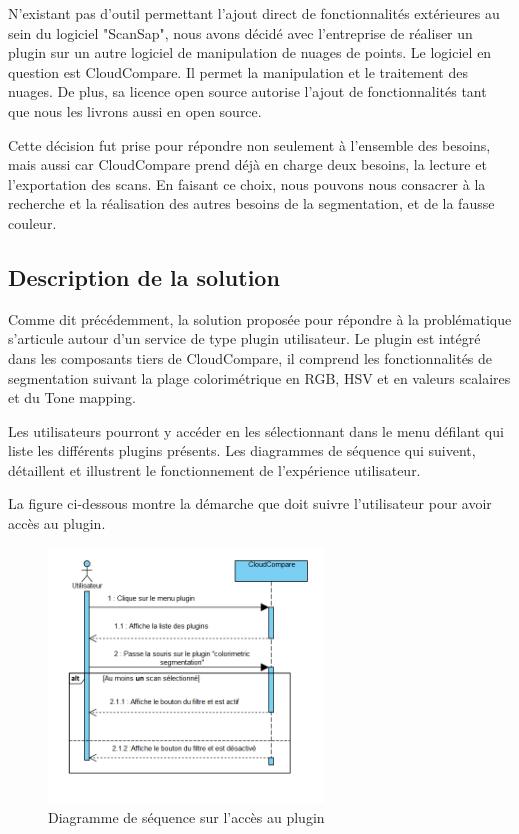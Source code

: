 \documentclass[12pt,titlepage,french]{article}
\begin{document}
N'existant pas d'outil permettant l'ajout direct de fonctionnalités extérieures au sein du logiciel "ScanSap", nous avons décidé avec l'entreprise de réaliser un plugin sur un autre logiciel de manipulation de nuages de points. Le logiciel en question est CloudCompare. Il permet la manipulation et le traitement des nuages. De plus, sa licence open source autorise l'ajout de fonctionnalités tant que nous les livrons aussi en open source. \newline

Cette décision fut prise pour répondre non seulement à l'ensemble des besoins, mais aussi car CloudCompare prend déjà en charge deux besoins, la lecture et l'exportation des scans. En faisant ce choix, nous pouvons nous consacrer à la recherche et la réalisation des autres besoins de la segmentation, et de la fausse couleur.

\subsection{Description de la solution}

Comme dit précédemment, la solution proposée pour répondre à la problématique s'articule autour d'un service de type plugin utilisateur. Le plugin est intégré dans les composants tiers de CloudCompare, il comprend les fonctionnalités de segmentation suivant la plage colorimétrique en RGB, HSV et en valeurs scalaires et du Tone mapping.  \newline

Les utilisateurs pourront y accéder en les sélectionnant dans le menu défilant qui liste les différents plugins présents. Les diagrammes de séquence qui suivent, détaillent et illustrent le fonctionnement de l'expérience utilisateur. \newline

La figure ci-dessous montre la démarche que doit suivre l'utilisateur pour avoir accès au plugin.

\begin{figure}[H]
\center
\includegraphics[width=0.65\textwidth]{./img/sequDiagPlugin.PNG}
    \caption{\label{} Diagramme de séquence sur l'accès au plugin}
\end{figure}
\end{document}
